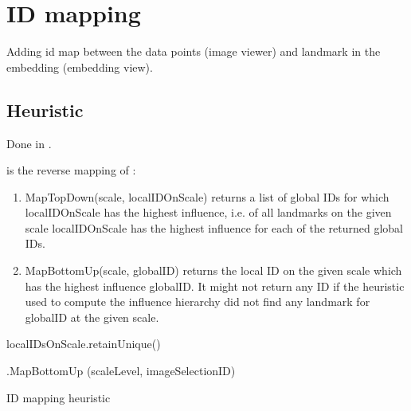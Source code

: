 \section{ID mapping} \label{sec:idMapping}

Adding id map between the data points (image viewer) and landmark in the embedding (embedding view).

\subsection{Heuristic}  \label{sec:idMappingHeuristic}
Done in .

\noindent
{} is the reverse mapping of :
\begin{enumerate}
	\item MapTopDown(scale, localIDOnScale) returns a list of global IDs for which localIDOnScale has the highest influence, i.e. of all landmarks on the given scale localIDOnScale has the highest influence for each of the returned global IDs.
	\item MapBottomUp(scale, globalID) returns the local ID on the given scale which has the highest influence globalID. It might not return any ID if the heuristic used to compute the influence hierarchy  did not find any landmark for globalID at the given scale.
\end{enumerate}

\begin{algorithm}[H]
	\DontPrintSemicolon
	\SetAlgoLined
	
	\BlankLine
	
	localIDsOnScale.retainUnique()
	
	\BlankLine
	\EmbeddingHierarchy
	
	\BlankLine
	\EmbeddingHierarchy.MapBottomUp \!\!(scaleLevel, imageSelectionID)
	
	\caption{ID mapping heuristic} \label{alg:idMappingHeuristic}
\end{algorithm} 


